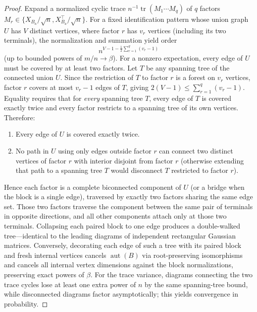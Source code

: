 \documentclass[11pt]{article}
\theoremstyle{plain}
\theoremstyle{definition}
\theoremstyle{remark}
\DeclareMathOperator{\tr}{tr}
\DeclareMathOperator{\aut}{aut}
\begin{document}
\begin{proof}
Expand a normalized cyclic trace $n^{-1}\tr(M_1 \cdots M_q)$ of $q$ factors $M_r \in \{X_{B_a}/\sqrt{n}, X_{B_a}^\top/\sqrt{n}\}$. For a fixed identification pattern whose union graph $U$ has $V$ distinct vertices, where factor $r$ has $v_r$ vertices (including its two terminals), the normalization and summation yield order
\[
n^{V - 1 - \frac{1}{2}\sum_{r=1}^q (v_r - 1)}
\]
(up to bounded powers of $m/n \to \beta$). For a nonzero expectation, every edge of $U$ must be covered by at least two factors. Let $T$ be any spanning tree of the connected union $U$. Since the restriction of $T$ to factor $r$ is a forest on $v_r$ vertices, factor $r$ covers at most $v_r - 1$ edges of $T$, giving $2(V - 1) \le \sum_{r=1}^q (v_r - 1)$. Equality requires that for \emph{every} spanning tree $T$, every edge of $T$ is covered exactly twice and every factor restricts to a spanning tree of its own vertices. Therefore:
\begin{enumerate}[label=\textup{(\arabic*)},leftmargin=2em,itemsep=1pt]
\item Every edge of $U$ is covered exactly twice.
\item No path in $U$ using only edges outside factor $r$ can connect two distinct vertices of factor $r$ with interior disjoint from factor $r$ (otherwise extending that path to a spanning tree $T$ would disconnect $T$ restricted to factor $r$).
\end{enumerate}
Hence each factor is a complete biconnected component of $U$ (or a bridge when the block is a single edge), traversed by exactly two factors sharing the same edge set. Those two factors traverse the component between the same pair of terminals in opposite directions, and all other components attach only at those two terminals. Collapsing each paired block to one edge produces a double-walked tree—identical to the leading diagrams of independent rectangular Gaussian matrices. Conversely, decorating each edge of such a tree with its paired block and fresh internal vertices cancels $\aut(B)$ via root-preserving isomorphisms and cancels all internal vertex dimensions against the block normalizations, preserving exact powers of $\beta$. For the trace variance, diagrams connecting the two trace cycles lose at least one extra power of $n$ by the same spanning-tree bound, while disconnected diagrams factor asymptotically; this yields convergence in probability.


\end{proof}
\end{document}
